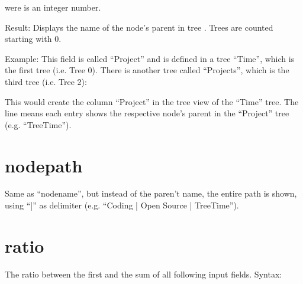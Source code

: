 \documentclass[letterpaper,10pt,english]{sphinxmanual}
\begin{document}
\sphinxAtStartPar
were  is an integer number.

\sphinxAtStartPar
Result: Displays the name of the node’s parent in tree . Trees are counted starting with 0.

\sphinxAtStartPar
Example: This field is called “Project” and is defined in a tree “Time”, which is the first tree (i.e. Tree 0). There is another tree called “Projects”, which is the third tree (i.e. Tree 2):

\begin{sphinxVerbatim}[commandchars=\\\{\}]
 
     
         
         \PYG{p}{[}\PYG{p}{]}
         \PYG{p}{[}\PYG{p}{]}
         \PYG{p}{[}\PYG{p}{]}
         \PYG{p}{[}\PYG{p}{]}

 

 
\end{sphinxVerbatim}

\sphinxAtStartPar
This would create the column “Project” in the tree view of the “Time” tree. The line  means each entry shows the respective node’s parent in the “Project” tree (e.g. “TreeTime”).


\section{node\sphinxhyphen{}path}
\label{\detokenize{tree-fields:node-path}}
\sphinxAtStartPar
Same as “node\sphinxhyphen{}name”, but instead of the paren’t name, the entire path is shown, using “|” as delimiter (e.g. “Coding | Open Source | TreeTime”).


\section{ratio}
\label{\detokenize{tree-fields:ratio}}
\sphinxAtStartPar
The ratio between the first and the sum of all following input fields.
Syntax:
\end{document}
